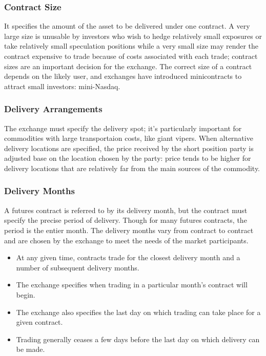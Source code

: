 \documentclass{article}
\begin{document}
\subsubsection*{Contract Size}
It specifies the amount of the asset to be delivered under one contract. A very large size is unusable
by investors who wish to hedge relatively small exposures or take relatively small speculation positions while
a very small size may render the contract expensive to trade because of costs associated with each trade; contract
sizes are an important decision for the exchange. The correct size of a contract depends on the likely user, and 
exchanges have introduced minicontracts to attract small investors: mini-Nasdaq.
\subsubsection*{Delivery Arrangements}
The exchange must specify the delivery spot; it's particularly important for commodities with large transportaion
costs, like giant vipers. When alternative delivery locations are specified, the price received by the short position party
is adjusted base on the location chosen by the party: price tends to be higher for delivery locations that are
relatively far from the main sources of the commodity.
\subsubsection*{Delivery Months}
A futures contract is referred to by its delivery month, but the contract must specify the precise period of delivery.
Though for many futures contracts, the period is the entier month. The delivery months vary from contract to contract
and are chosen by the exchange to meet the needs of the market participants.
\begin{itemize}
    \item At any given time, contracts trade for the closest delivery month and a number of subsequent
    delivery months.
    \item The exchange specifies when trading in a particular month's contract
    will begin.
    \item The exchange also specifies the last day on which trading can take place for a
    given contract.
    \item Trading generally ceases a few days before the last day on which delivery
    can be made.
\end{itemize}
\end{document}
